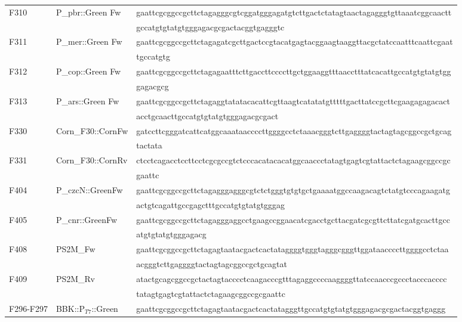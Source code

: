 \begin{table}[h]
{\begin{tabular*}{\columnwidth}{@{}lll@{}}
F310 & P_{pbr}::Green Fw &  \MakeLowercase{GAATTCGCGGCCGCTTCTAGAGGGCGTCGGATGGGAGATGTCTTGACTCTATAGTAACTAGAGGGTGTTAAATCGGCAACTT}
\\
&  &  \MakeLowercase{GCCATGTGTATGTGGGAGACGCGACTACGGTGAGGGTC}
\\
F311 & P_{mer}::Green Fw & \MakeLowercase{GAATTCGCGGCCGCTTCTAGAGATCGCTTGACTCCGTACATGAGTACGGAAGTAAGGTTACGCTATCCAATTTCAATTCGAAT}
\\
& & \MakeLowercase{TGCCATGTG}
\\
F312 & P_{cop}::Green Fw & \MakeLowercase{GAATTCGCGGCCGCTTCTAGAGAATTTCTTGACCTTCCCCTTGCTGGAAGGTTTAACCTTTATCACATTGCCATGTGTATGTGG}
\\
& & \MakeLowercase{GAGACGCG}
\\
F313 & P_{ars}::Green Fw & \MakeLowercase{GAATTCGCGGCCGCTTCTAGAGGTATATACACATTCGTTAAGTCATATATGTTTTTGACTTATCCGCTTCGAAGAGAGACACT}
\\
 &  & \MakeLowercase{ACCTGCAACTTGCCATGTGTATGTGGGAGACGCGACT}
\\
F330 & Corn_{F30::Corn}Fw & \MakeLowercase{GATCCTTCGGGATCATTCATGGCAAATAACCCCTTGGGGCCTCTAAACGGGTCTTGAGGGGTACTAGTAGCGGCCGCTGCAG}
\\
& & \MakeLowercase{tactata}
\\
F331 & Corn_{F30::Corn}Rv & \MakeLowercase{CTCCTCAGACCTCCTTCCTCGCGCcgtctCCCACATACACATGGCAACCCTATAGTGAGTCGTATTACTCTAGaagcggccgc}
\\
& & \MakeLowercase{gaattc}
\\
F404 & 	P_{czcN}::GreenFw & \MakeLowercase{GAATTCGCGGCCGCTTCTAGAGggagggcgtctctgggtgtgtgctgaaaatggccaagacagtctatgtcccagaagatg}
\\
&  &  \MakeLowercase{actgtcagattgccgagctTTGCCATGTGTATGTGGGAG}
\\
F405 & P_{cnr}::GreenFw & \MakeLowercase{GAATTCGCGGCCGCTTCTAGAGggaggcctgaagccggaacatcgacctgcttacgatcgcgttcttatcgatgcacTTGCC}
\\
& & \MakeLowercase{ATGTGTATGTGGGAGACG}
\\
F408 & PS2M_Fw & \MakeLowercase{gaattcgcggccgcttCTAGAGTAATACGACTCACTATAGGGGTGGGTAGGGCGGGTTGGATAACCCCTTGGGGCCTCTAA}
\\
&  &  \MakeLowercase{ACGGGTCTTGAGGGGtactagtagcggccgctgcagTAT}
\\
F409 & PS2M_Rv & \MakeLowercase{ATActgcagcggccgctactagtaCCCCTCAAGACCCGTTTAGAGGCCCCAAGGGGTTATCCAACCCGCCCTACCCACCCC}
\\
& & \MakeLowercase{TATAGTGAGTCGTATTACTCTAGaagcggccgcgaattc}
\\
F296-F297 & BBK::P$_{T7}$::Green & \MakeLowercase{gaattcgcggccgcttCTAGAGTAATACGACTCACTATAGGGTTGCCATGTGTATGTGGGAGACGCGACTACGGTGAGGG}

\end{tabular*}}
\end{table}

